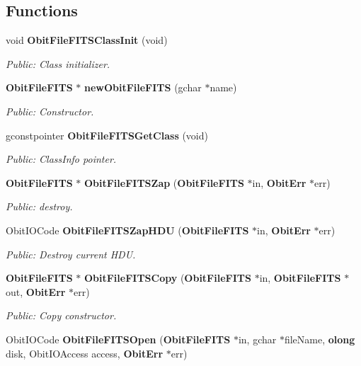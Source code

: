 \subsection*{Functions}
\begin{CompactItemize}
\item 
void {\bf Obit\-File\-FITSClass\-Init} (void)
\begin{CompactList}\small\item\em Public: Class initializer. \item\end{CompactList}\item 
{\bf Obit\-File\-FITS} $\ast$ {\bf new\-Obit\-File\-FITS} (gchar $\ast$name)
\begin{CompactList}\small\item\em Public: Constructor. \item\end{CompactList}\item 
gconstpointer {\bf Obit\-File\-FITSGet\-Class} (void)
\begin{CompactList}\small\item\em Public: Class\-Info pointer. \item\end{CompactList}\item 
{\bf Obit\-File\-FITS} $\ast$ {\bf Obit\-File\-FITSZap} ({\bf Obit\-File\-FITS} $\ast$in, {\bf Obit\-Err} $\ast$err)
\begin{CompactList}\small\item\em Public: destroy. \item\end{CompactList}\item 
Obit\-IOCode {\bf Obit\-File\-FITSZap\-HDU} ({\bf Obit\-File\-FITS} $\ast$in, {\bf Obit\-Err} $\ast$err)
\begin{CompactList}\small\item\em Public: Destroy current HDU. \item\end{CompactList}\item 
{\bf Obit\-File\-FITS} $\ast$ {\bf Obit\-File\-FITSCopy} ({\bf Obit\-File\-FITS} $\ast$in, {\bf Obit\-File\-FITS} $\ast$out, {\bf Obit\-Err} $\ast$err)
\begin{CompactList}\small\item\em Public: Copy constructor. \item\end{CompactList}\item 
Obit\-IOCode {\bf Obit\-File\-FITSOpen} ({\bf Obit\-File\-FITS} $\ast$in, gchar $\ast$file\-Name, {\bf olong} disk, Obit\-IOAccess access, {\bf Obit\-Err} $\ast$err)

\end{CompactItemize}
